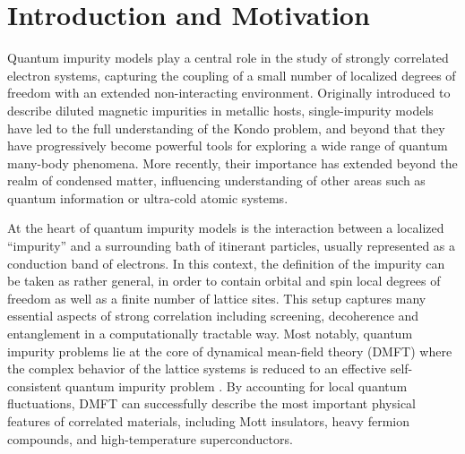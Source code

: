 \documentclass[edipack_sp.tex]{subfiles}
\begin{document}

\section{Introduction and Motivation}\label{SecIntro}
Quantum impurity models play a central role in the study of strongly correlated electron systems, capturing the coupling of a small number of localized degrees of freedom with an extended non-interacting environment.   
Originally introduced to describe diluted magnetic impurities in metallic hosts, single-impurity models have led to the full understanding of the Kondo problem, and beyond that they have progressively become powerful tools for exploring a wide range of quantum many-body phenomena. More recently, their importance has extended beyond the realm of condensed matter, influencing understanding of other areas such as quantum information or ultra-cold atomic systems.

At the heart of quantum impurity models is the interaction between a localized ``impurity''  and a surrounding bath of itinerant particles, usually represented as a conduction band of electrons. In this context, the definition of the impurity can be taken as rather general, in order to contain orbital and spin local degrees of freedom as well as a finite number of lattice sites. %
This setup captures many essential aspects of strong correlation including screening, decoherence and entanglement in a computationally tractable way. 
Most notably, quantum impurity problems lie at the core of dynamical mean-field theory (DMFT) where the complex behavior of the lattice systems is reduced to an effective self-consistent quantum impurity problem \cite{Georges1996RMP}.
By accounting for local quantum fluctuations, DMFT can successfully describe the most important physical features of correlated materials, including Mott insulators, heavy fermion compounds, and high-temperature superconductors.  
\end{document}
